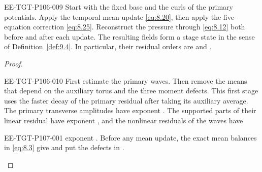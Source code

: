 \begin{proposition}\label{prop:9.5}
\begin{EESegment}{EE-TGT-P106-009}
Start with the fixed base and the curls of the primary potentials. Apply the temporal mean update
\eqref{eq:8.20}, then apply the five-equation correction \eqref{eq:8.25}. Reconstruct the pressure
through \eqref{eq:8.12} both before and after each update. The resulting fields form a stage
 state in the sense of Definition~\ref{def:9.4}. In particular, their
residual orders are  and
.
\end{EESegment}
\end{proposition}

\begin{proof}
\begin{EESegment}{EE-TGT-P106-010}
First estimate the primary waves. Then remove the means that depend on the auxiliary torus and the
three moment defects. This first stage uses the faster decay of the primary residual after taking
its auxiliary average. The primary transverse amplitudes have exponent
. The supported parts of their linear residual have exponent
, and the nonlinear residuals of the waves have
\end{EESegment}
%
\begin{EESegment}{EE-TGT-P107-001}
exponent . Before any mean update, the exact mean balances in
\eqref{eq:8.3} give  and put
the defects in .
\end{EESegment}


\end{proof}
